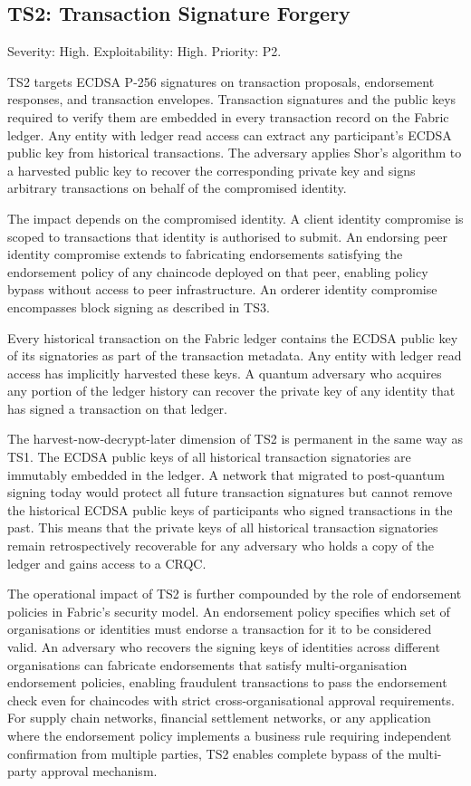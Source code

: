 \documentclass[conference]{IEEEtran}
\begin{document}
\subsection{TS2: Transaction Signature Forgery}

Severity: High. Exploitability: High. Priority: P2.

TS2 targets ECDSA P-256 signatures on transaction proposals, endorsement
responses, and transaction envelopes. Transaction signatures and the public
keys required to verify them are embedded in every transaction record on
the Fabric ledger. Any entity with ledger read access can extract any
participant's ECDSA public key from historical transactions. The adversary
applies Shor's algorithm to a harvested public key to recover the
corresponding private key and signs arbitrary transactions on behalf of
the compromised identity.

The impact depends on the compromised identity. A client identity
compromise is scoped to transactions that identity is authorised to
submit. An endorsing peer identity compromise extends to fabricating
endorsements satisfying the endorsement policy of any chaincode deployed
on that peer, enabling policy bypass without access to peer infrastructure.
An orderer identity compromise encompasses block signing as described in TS3.

Every historical transaction on the Fabric ledger contains the ECDSA
public key of its signatories as part of the transaction metadata. Any
entity with ledger read access has implicitly harvested these keys. A
quantum adversary who acquires any portion of the ledger history can
recover the private key of any identity that has signed a transaction on
that ledger.

The harvest-now-decrypt-later dimension of TS2 is permanent in the same
way as TS1. The ECDSA public keys of all historical transaction
signatories are immutably embedded in the ledger. A network that migrated
to post-quantum signing today would protect all future transaction
signatures but cannot remove the historical ECDSA public keys of
participants who signed transactions in the past. This means that the
private keys of all historical transaction signatories remain
retrospectively recoverable for any adversary who holds a copy of the
ledger and gains access to a CRQC.

The operational impact of TS2 is further compounded by the role of
endorsement policies in Fabric's security model. An endorsement policy
specifies which set of organisations or identities must endorse a
transaction for it to be considered valid. An adversary who recovers
the signing keys of identities across different organisations can
fabricate endorsements that satisfy multi-organisation endorsement
policies, enabling fraudulent transactions to pass the endorsement check
even for chaincodes with strict cross-organisational approval requirements.
For supply chain networks, financial settlement networks, or any
application where the endorsement policy implements a business rule
requiring independent confirmation from multiple parties, TS2 enables
complete bypass of the multi-party approval mechanism.
\end{document}
